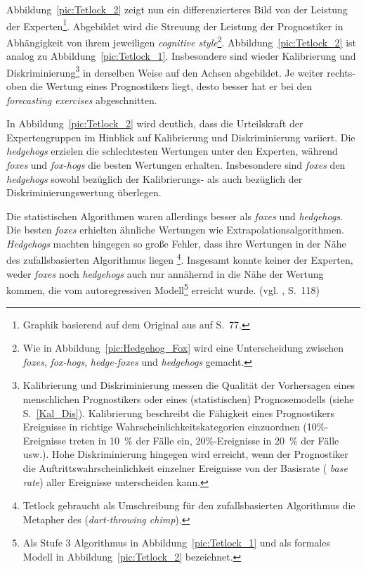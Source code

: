 Abbildung~\ref{pic:Tetlock_2} zeigt nun ein differenzierteres Bild von der
Leistung der Experten\footnote{
Graphik basierend auf dem Original aus \cite{Tetlock} auf S.~77.
}. Abgebildet wird die Streuung der Leistung der Prognostiker in Abhängigkeit
von ihrem jeweiligen \emph{cognitive style}\footnote{
Wie in Abbildung~\ref{pic:Hedgehog_Fox} wird eine Unterscheidung zwischen
\emph{foxes}, \emph{fox-hogs}, \emph{hedge-foxes} und \emph{hedgehogs} gemacht.
}. Abbildung~\ref{pic:Tetlock_2} ist analog zu Abbildung~\ref{pic:Tetlock_1}.
Insbesondere sind wieder Kalibrierung und Diskriminierung\footnote{
Kalibrierung und Diskriminierung messen die Qualität der Vorhersagen eines
menschlichen Prognostikers oder eines (statistischen) Prognosemodells
(siehe S.~\ref{Kal_Dis}). Kalibrierung beschreibt die Fähigkeit eines
Prognostikers Ereignisse in richtige Wahrscheinlichkeitskategorien einzuordnen
(10\%-Ereignisse treten in 10~\% der Fälle ein, 20\%-Ereignisse in 20~\% der
Fälle usw.). Hohe Diskriminierung hingegen wird erreicht, wenn der Prognostiker
die Auftrittswahrscheinlichkeit einzelner Ereignisse von der Basisrate (
\emph{base rate}) aller Ereignisse unterscheiden kann. 
} in derselben Weise auf den Achsen abgebildet. Je weiter rechts-oben die
Wertung eines Prognostikers liegt, desto besser hat er bei den
\emph{forecasting exercises} abgeschnitten.

In Abbildung~\ref{pic:Tetlock_2} wird deutlich, dass die Urteilskraft der
Expertengruppen im Hinblick auf Kalibrierung und Diskriminierung variiert. Die
\emph{hedgehogs} erzielen die schlechtesten Wertungen unter den Experten,
während \emph{foxes} und \emph{fox-hogs} die besten Wertungen erhalten.
Insbesondere sind \emph{foxes} den \emph{hedgehogs} sowohl bezüglich der
Kalibrierungs- als auch bezüglich der Diskriminierungswertung überlegen.

Die statistischen Algorithmen waren allerdings besser als \emph{foxes} und
\emph{hedgehogs}. Die besten \emph{foxes} erhielten ähnliche Wertungen wie
Extrapolationsalgorithmen. \emph{Hedgehogs} machten hingegen so große Fehler,
dass ihre Wertungen in der Nähe des zufallsbasierten Algorithmus liegen
\footnote{
Tetlock gebraucht als Umschreibung für den zufallsbasierten Algorithmus die
Metapher des \grqq
(\emph{dart-throwing chimp}).
}. Insgesamt konnte keiner der Experten, weder \emph{foxes} noch
\emph{hedgehogs} auch nur annähernd in die Nähe der Wertung kommen, die vom
autoregressiven Modell\footnote{
Als Stufe 3 Algorithmus in Abbildung~\ref{pic:Tetlock_1} und als formales
Modell in Abbildung~\ref{pic:Tetlock_2} bezeichnet.
} erreicht wurde. (vgl. \cite{Tetlock}, S.~118)

